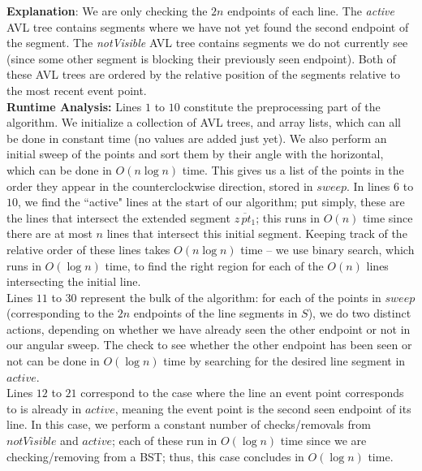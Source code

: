 \documentclass[11pt]{article}
\begin{document}
\begin{enumerate}
    \textbf{Explanation}: We are only checking the $2n$ endpoints of each line. The \textit{active} AVL tree contains segments where we have not yet found the second endpoint of the segment. The \textit{notVisible} AVL tree contains segments we do not currently see (since some other segment is blocking their previously seen endpoint). Both of these AVL trees are ordered by the relative position of the segments relative to the most recent event point. \\
    
    \textbf{Runtime Analysis:}
    Lines $1$ to $10$ constitute the preprocessing part of the algorithm. We initialize a collection of AVL trees, and array lists, which can all be done in constant time (no values are added just yet). We also perform an initial sweep of the points and sort them by their angle with the horizontal, which can be done in $O(n\log n)$ time. This gives us a list of the points in the order they appear in the counterclockwise direction, stored in $sweep$. In lines $6$ to $10$, we find the ``active" lines at the start of our algorithm; put simply, these are the lines that intersect the extended segment $\overline{z \, pt_1}$; this runs in $O(n)$ time since there are at most $n$ lines that intersect this initial segment. Keeping track of the relative order of these lines takes $O(n \log n)$ time -- we use binary search, which runs in $O(\log n)$ time, to find the right region for each of the $O(n)$ lines intersecting the initial line. \\

    Lines $11$ to $30$ represent the bulk of the algorithm: for each of the points in $sweep$ (corresponding to the $2n$ endpoints of the line segments in $S$), we do two distinct actions, depending on whether we have already seen the other endpoint or not in our angular sweep. The check to see whether the other endpoint has been seen or not can be done in $O(\log n)$ time by searching for the desired line segment in $active$.\\

    Lines $12$ to $21$ correspond to the case where the line an event point corresponds to is already in $active$, meaning the event point is the second seen endpoint of its line. In this case, we perform a constant number of checks/removals from $notVisible$ and $active$; each of these run in $O(\log n)$ time since we are checking/removing from a BST; thus, this case concludes in $O(\log n)$ time. \\


\end{enumerate}
\end{document}
